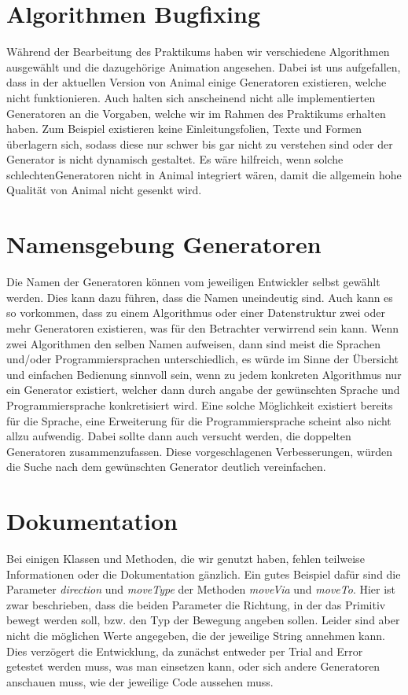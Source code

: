 \documentclass[solution]{report}
\begin{document}
		\section{Algorithmen Bugfixing}
			Während der Bearbeitung des Praktikums haben wir verschiedene Algorithmen ausgewählt und die dazugehörige Animation angesehen. Dabei ist uns aufgefallen, dass in der aktuellen Version von Animal einige Generatoren existieren, welche nicht funktionieren. Auch halten sich anscheinend nicht alle implementierten Generatoren an die Vorgaben, welche wir im Rahmen des Praktikums erhalten haben. Zum Beispiel existieren keine Einleitungsfolien, Texte und Formen überlagern sich, sodass diese nur schwer bis gar nicht zu verstehen sind oder der Generator is nicht dynamisch gestaltet. Es wäre hilfreich, wenn solche \glqq schlechten\grqq \space Generatoren nicht in Animal integriert wären, damit die allgemein hohe Qualität von Animal nicht gesenkt wird.
		\section{Namensgebung Generatoren}
			Die Namen der Generatoren können vom jeweiligen Entwickler selbst gewählt werden. Dies kann dazu führen, dass die Namen uneindeutig sind. Auch kann es so vorkommen, dass zu einem Algorithmus oder einer Datenstruktur zwei oder mehr Generatoren existieren, was für den Betrachter verwirrend sein kann. Wenn zwei Algorithmen den selben Namen aufweisen, dann sind meist die Sprachen und/oder Programmiersprachen unterschiedlich, es würde im Sinne der Übersicht und einfachen Bedienung sinnvoll sein, wenn zu jedem konkreten Algorithmus nur ein Generator existiert, welcher dann durch angabe der gewünschten Sprache und Programmiersprache konkretisiert wird. Eine solche Möglichkeit existiert bereits für die Sprache, eine Erweiterung für die Programmiersprache scheint also nicht allzu aufwendig. Dabei sollte dann auch versucht werden, die doppelten Generatoren zusammenzufassen. Diese vorgeschlagenen Verbesserungen, würden die Suche nach dem gewünschten Generator deutlich vereinfachen.
		\section{Dokumentation}
			Bei einigen Klassen und Methoden, die wir genutzt haben, fehlen teilweise Informationen oder die Dokumentation gänzlich. Ein gutes Beispiel dafür sind die Parameter \textit{direction} und \textit{moveType} der Methoden \textit{moveVia} und \textit{moveTo}. Hier ist zwar beschrieben, dass die beiden Parameter die Richtung, in der das Primitiv bewegt werden soll, bzw. den Typ der Bewegung angeben sollen. Leider sind aber nicht die möglichen Werte angegeben, die der jeweilige String annehmen kann. Dies verzögert die Entwicklung, da zunächst entweder per Trial and Error getestet werden muss, was man einsetzen kann, oder sich andere Generatoren anschauen muss, wie der jeweilige Code aussehen muss.
		
\end{document}
